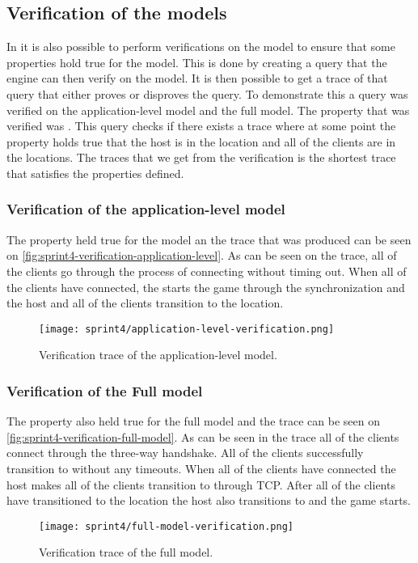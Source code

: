\subsection{Verification of the models}
In \uppaal it is also possible to perform verifications on the model to ensure that some properties hold true for the model.
This is done by creating a query that the \uppaal engine can then verify on the model.
It is then possible to get a trace of that query that either proves or disproves the query.
To demonstrate this a query was verified on the application-level model and the full model.
The property that was verified was .
This query checks if there exists a trace where at some point the property holds true that the host is in the  location and all of the clients are in the  locations.
The traces that we get from the verification is the shortest trace that satisfies the properties defined.

\subsubsection{Verification of the application-level model}
The property held true for the model an the trace that was produced can be seen on \autoref{fig:sprint4-verification-application-level}.
As can be seen on the trace, all of the clients go through the process of connecting without timing out.
When all of the clients have connected, the  starts the game through the  synchronization and the host and all of the clients transition to the  location.
\begin{figure}[H]
    \centering
    \texttt{[image: sprint4/application-level-verification.png]}
    \caption{Verification trace of the application-level model.}
    \label{fig:sprint4-verification-application-level}
\end{figure}

\subsubsection{Verification of the Full model}
The property also held true for the full model and the trace can be seen on \autoref{fig:sprint4-verification-full-model}.
As can be seen in the trace all of the clients connect through the three-way handshake.
All of the clients successfully transition to  without any timeouts.
When all of the clients have connected the host makes all of the clients transition to  through TCP.
After all of the clients have transitioned to the  location the host also transitions to  and the game starts.
\begin{figure}[H]
    \centering
    \texttt{[image: sprint4/full-model-verification.png]}
    \caption{Verification trace of the full model.}
    \label{fig:sprint4-verification-full-model}
\end{figure}

